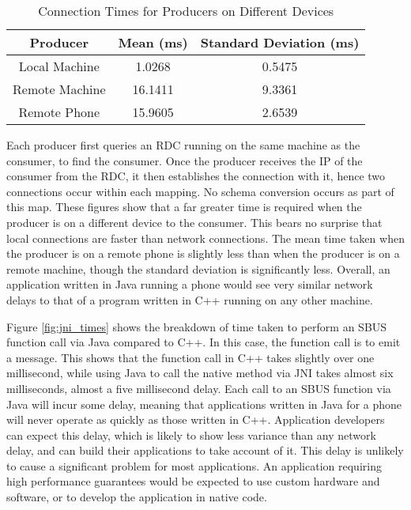 \documentclass[12pt,twoside,notitlepage]{report}
\begin{document}
\begin{table}[h]
\centering

\begin{tabular}{c c c}
\hline\hline

Producer & Mean (ms) & Standard Deviation (ms) \\
\hline

Local Machine	&	1.0268	&	0.5475 \\
Remote Machine	&	16.1411	&	9.3361 \\
Remote Phone	&	15.9605	&	2.6539 \\

\hline
\end{tabular}

\caption{Connection Times for Producers on Different Devices}
\label{tab:map_times}
\end{table}

Each producer first queries an RDC running on the same machine as the consumer, to find the consumer. 
Once the producer receives the IP of the consumer from the RDC, it then establishes the connection with it, hence two connections occur within each mapping. 
No schema conversion occurs as part of this map. 
These figures show that a far greater time is required when the producer is on a different device to the consumer. 
This bears no surprise that local connections are faster than network connections. 
The mean time taken when the producer is on a remote phone is slightly less than when the producer is on a remote machine, though the standard deviation is significantly less. 
Overall, an application written in Java running a phone would see very similar network delays to that of a program written in C++ running on any other machine.


Figure \ref{fig:jni_times} shows the breakdown of time taken to perform an SBUS function call via Java compared to C++. 
In this case, the function call is to emit a message. 
This shows that the function call in C++ takes slightly over one millisecond, while using Java to call the native method via JNI takes almost six milliseconds, almost a five millisecond delay. 
Each call to an SBUS function via Java will incur some delay, meaning that applications written in Java for a phone will never operate as quickly as those written in C++.
Application developers can expect this delay, which is likely to show less variance than any network delay, and can build their applications to take account of it. 
This delay is unlikely to cause a significant problem for most applications. 
An application requiring high performance guarantees would be expected to use custom hardware and software, or to develop the application in native code. 
\end{document}
